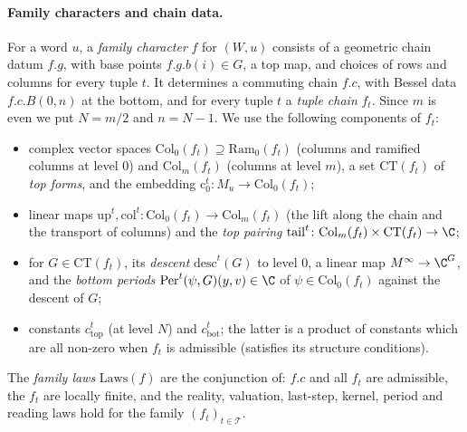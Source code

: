 \paragraph{Family characters and chain data.}
For a word $u$, a \emph{family character} $f$ for $(W,u)$ consists of a geometric chain datum $f.g$, with base points
$f.g.b(i)\in G$, a top map, and choices of rows and columns for every tuple $t$. It determines a commuting chain $f.c$,
with Bessel data $f.c.B(0,n)$ at the bottom, and for every tuple $t$ a \emph{tuple chain} $f_t$. Since $m$ is even we
put $N=m/2$ and $n=N-1$. We use the following components of $f_t$:
\begin{itemize}
\item complex vector spaces $\mathrm{Col}_0(f_t)\supseteq\mathrm{Ram}_0(f_t)$ (columns and ramified columns at level
$0$) and $\mathrm{Col}_m(f_t)$ (columns at level $m$), a set $\mathrm{CT}(f_t)$ of \emph{top forms}, and the embedding
$\mathrm c_0^t\colon M_u\to\mathrm{Col}_0(f_t)$;
\item linear maps $\mathrm{up}^t,\mathrm{col}^t\colon\mathrm{Col}_0(f_t)\to\mathrm{Col}_m(f_t)$ (the lift along the chain
and the transport of columns) and the \emph{top pairing}
$\mathrm{tail}^t\colon\mathrm{Col}_m(f_t)\times\mathrm{CT}(f_t)\to\C$;
\item for $G\in\mathrm{CT}(f_t)$, its \emph{descent} $\mathrm{desc}^t(G)$ to level $0$, a linear map
$M^{\infty}\to\C^G$, and the \emph{bottom periods} $\mathrm{Per}^t(\psi,G)(y,v)\in\C$ of $\psi\in\mathrm{Col}_0(f_t)$
against the descent of $G$;
\item constants $c_{\mathrm{top}}^t$ (at level $N$) and $c_{\mathrm{bot}}^t$; the latter is a product of constants which are
all non-zero when $f_t$ is admissible (satisfies its structure conditions).
\end{itemize}
The \emph{family laws} $\mathrm{Laws}(f)$ are the conjunction of: $f.c$ and all $f_t$ are admissible, the $f_t$ are
locally finite, and the reality, valuation, last-step, kernel, period and reading laws hold for the family
$(f_t)_{t\in\mathcal T}$.

